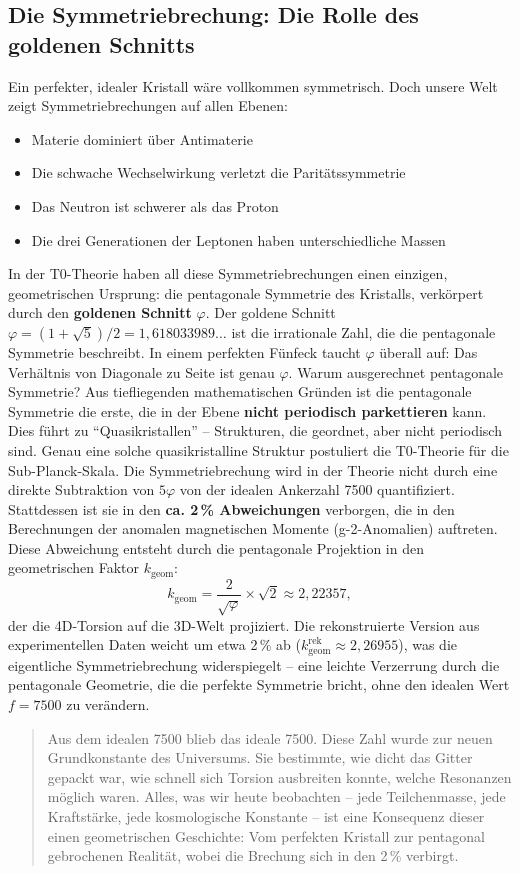 	\subsection{Die Symmetriebrechung: Die Rolle des goldenen Schnitts}
	Ein perfekter, idealer Kristall wäre vollkommen symmetrisch. Doch unsere Welt zeigt Symmetriebrechungen auf allen Ebenen:
	\begin{itemize}
		\item Materie dominiert über Antimaterie
		\item Die schwache Wechselwirkung verletzt die Paritätssymmetrie
		\item Das Neutron ist schwerer als das Proton
		\item Die drei Generationen der Leptonen haben unterschiedliche Massen
	\end{itemize}
	In der T0-Theorie haben all diese Symmetriebrechungen einen einzigen, geometrischen Ursprung: die pentagonale Symmetrie des Kristalls, verkörpert durch den \textbf{goldenen Schnitt} \(\varphi\).
	Der goldene Schnitt \(\varphi = (1+\sqrt{5})/2 = 1{,}618033989\ldots\) ist die irrationale Zahl, die die pentagonale Symmetrie beschreibt. In einem perfekten Fünfeck taucht \(\varphi\) überall auf: Das Verhältnis von Diagonale zu Seite ist genau \(\varphi\).
	Warum ausgerechnet pentagonale Symmetrie? Aus tiefliegenden mathematischen Gründen ist die pentagonale Symmetrie die erste, die in der Ebene \textbf{nicht periodisch parkettieren} kann. Dies führt zu \enquote{Quasikristallen} -- Strukturen, die geordnet, aber nicht periodisch sind. Genau eine solche quasikristalline Struktur postuliert die T0-Theorie für die Sub-Planck-Skala.
	Die Symmetriebrechung wird in der Theorie nicht durch eine direkte Subtraktion von \(5\varphi\) von der idealen Ankerzahl 7500 quantifiziert. Stattdessen ist sie in den \textbf{ca. 2\,\% Abweichungen} verborgen, die in den Berechnungen der anomalen magnetischen Momente (g-2-Anomalien) auftreten. Diese Abweichung entsteht durch die pentagonale Projektion in den geometrischen Faktor \(k_\text{geom}\):
	\begin{equation}
		k_\text{geom} = \frac{2}{\sqrt{\varphi}} \times \sqrt{2} \approx 2{,}22357,
	\end{equation}
	der die 4D-Torsion auf die 3D-Welt projiziert. Die rekonstruierte Version aus experimentellen Daten weicht um etwa 2\,\% ab (\(k_\text{geom}^\text{rek} \approx 2{,}26955\)), was die eigentliche Symmetriebrechung widerspiegelt -- eine leichte Verzerrung durch die pentagonale Geometrie, die die perfekte Symmetrie bricht, ohne den idealen Wert \(f = 7500\) zu verändern.
	\begin{quotation}
		Aus dem idealen 7500 blieb das ideale 7500. Diese Zahl wurde zur neuen Grundkonstante des Universums. Sie bestimmte, wie dicht das Gitter gepackt war, wie schnell sich Torsion ausbreiten konnte, welche Resonanzen möglich waren.
		Alles, was wir heute beobachten -- jede Teilchenmasse, jede Kraftstärke, jede kosmologische Konstante -- ist eine Konsequenz dieser einen geometrischen Geschichte: Vom perfekten Kristall zur pentagonal gebrochenen Realität, wobei die Brechung sich in den 2\,\% verbirgt.
	\end{quotation}
	

